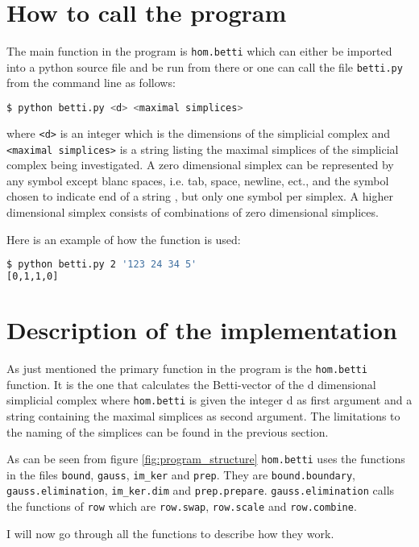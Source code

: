 \documentclass[11pt,a4paper,twoside]{report}
\begin{document}
\section{How to call the program}
The main function in the program is \texttt{hom.betti} which can either be imported into a python source file and be run from there or one can call the file \texttt{betti.py} from the command line as follows:
\begin{lstlisting}[language=bash]
$ python betti.py <d> <maximal simplices> 
\end{lstlisting}
where \texttt{<d>} is an integer which is the dimensions of the simplicial complex and \texttt{<maximal simplices>} is a string listing the maximal simplices of the simplicial complex being investigated. A zero dimensional simplex can be represented by any symbol except blanc spaces, i.e. tab, space, newline, ect., and the symbol chosen to indicate end of a string , but only one symbol per simplex. A higher dimensional simplex consists of combinations of zero dimensional simplices.

Here is an example of how the function is used:
\begin{lstlisting}[language=bash]
$ python betti.py 2 '123 24 34 5'
[0,1,1,0] 
\end{lstlisting}

\section{Description of the implementation}
As just mentioned the primary function in the program is the \texttt{hom.betti} function. It is the one that calculates the Betti-vector of the d dimensional simplicial complex where \texttt{hom.betti} is given the integer d as first argument and a string containing the maximal simplices as second argument. The limitations to the naming of the simplices can be found in the previous section. 

As can be seen from figure \ref{fig:program_structure} \texttt{hom.betti} uses the functions in the files \texttt{bound}, \texttt{gauss}, \texttt{im\_ker} and \texttt{prep}. They are \texttt{bound.boundary}, \texttt{gauss.elimination}, \texttt{im\_ker.dim} and \texttt{prep.prepare}. \texttt{gauss.elimination} calls the functions of \texttt{row} which are \texttt{row.swap}, \texttt{row.scale} and \texttt{row.combine}.

I will now go through all the functions to describe how they work.
\end{document}
